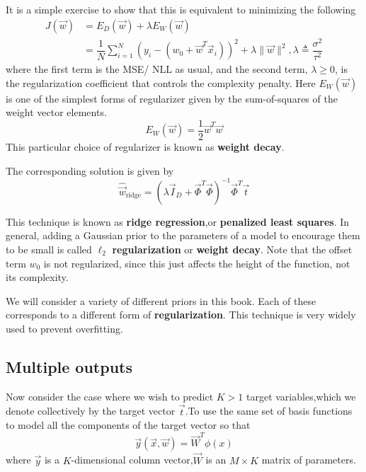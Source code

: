It is a simple exercise to show that this is equivalent to minimizing the following
\begin{align}\label{eqn:Ridge-regression-J}
J(\vec{w})&=E_D(\vec{w})+\lambda E_W(\vec{w}) \\
&=\dfrac{1}{N}\sum\limits_{i=1}^N (y_i-(w_0+\vec{w}^T\vec{x}_i))^2+\lambda\lVert\vec{w}\rVert^2 , \lambda \triangleq \dfrac{\sigma^2}{\tau^2}
\end{align}
where the first term is the MSE/ NLL as usual, and the second term, $\lambda \geq 0$, is the regularization coefficient that controls the complexity penalty.
Here $E_W(\vec{w})$ is one of the simplest forms of regularizer given by the sum-of-squares of the weight vector elements.
\begin{equation}
E_W(\vec{w})=\dfrac{1}{2}\vec{w}^T\vec{w}
\end{equation}
This particular choice of regularizer is known as \textbf{weight decay}.

The corresponding solution is given by
\begin{equation}\label{eqn:Ridge-regression-solution}
\hat{\vec{w}}_{\mathrm{ridge}}=(\lambda\vec{I}_D+\vec{\Phi}^T\vec{\Phi})^{-1}\vec{\Phi}^T\vec{t}
\end{equation}

This technique is known as \textbf{ridge regression},or \textbf{penalized least squares}. In general, adding a Gaussian prior to the parameters of a model to encourage them to be small is called $\ell_2$ \textbf{regularization} or \textbf{weight decay}. Note that the offset term $w_0$ is not regularized, since this just affects the height of the function, not its complexity.

We will consider a variety of different priors in this book. Each of these corresponds to a different form of \textbf{regularization}. This technique is very widely used to prevent overfitting.

\subsection{Multiple outputs}
Now consider the case where we wish to predict $K>1$ target variables,which we denote collectively by the target vector $\vec{t}$.To use the same set of basis functions to model all the components of the target vector so that
\begin{equation}
\vec{y}(\vec{x},\vec{w}) = \vec{W}^T\phi(x)
\end{equation}
where $\vec{y}$ is a $K$-dimensional column vector,$\vec{W}$ is an $M\times K$ matrix of parameters.

